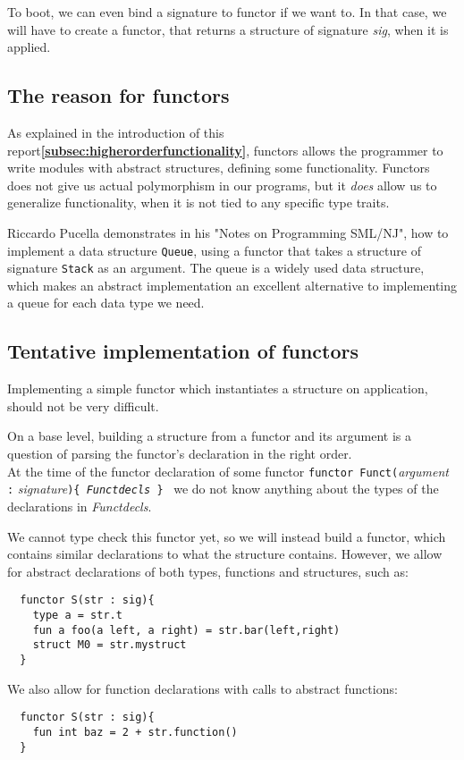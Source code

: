 To boot, we can even bind a signature to functor if we want to. In that case, we
will have to create a functor, that returns a structure of signature
\textit{sig}, when it is applied.

\subsection{The reason for functors}
\label{subsec:reasonfunctors}
As explained in the introduction of this report\textbf{\ref{subsec:higherorderfunctionality}},
functors allows the programmer to write modules with abstract structures,
defining some functionality.
Functors does not give us actual polymorphism in our programs, but it
\emph{does} allow us to generalize functionality, when it is not tied to any
specific type traits.

Riccardo Pucella demonstrates in his "Notes on Programming SML/NJ"\cite[pp. 59-60]{functors}, how to implement a data structure \texttt{Queue}, using a functor that takes a structure of signature \texttt{Stack} as an argument. The queue is a widely used data structure, which makes an abstract implementation an excellent alternative to implementing a queue for each data type we need.
\subsection{Tentative implementation of functors}
\label{subsec:implementing_functors}
Implementing a simple functor which instantiates a structure on application,
should not be very difficult.

On a base level, building a structure from a functor and its argument is a
question of parsing the functor's declaration in the right order.\\
At the time of the functor declaration of some functor
\texttt{functor Funct(}\textit{argument} \texttt{:}
\textit{signature}\texttt{)\{ \textit{Functdecls} \}} \, we do not
know anything about the types of the declarations in \textit{Functdecls}.

We cannot type check this functor yet, so we will instead build a functor,
which contains similar declarations to what the structure contains.
However, we allow for abstract declarations of both types, functions and
structures, such as:
\begin{lstlisting}
  functor S(str : sig){
    type a = str.t
    fun a foo(a left, a right) = str.bar(left,right)
    struct M0 = str.mystruct
  }
\end{lstlisting}
We also allow for function declarations with calls to abstract functions:
\begin{lstlisting}
  functor S(str : sig){
    fun int baz = 2 + str.function()
  }
\end{lstlisting}

